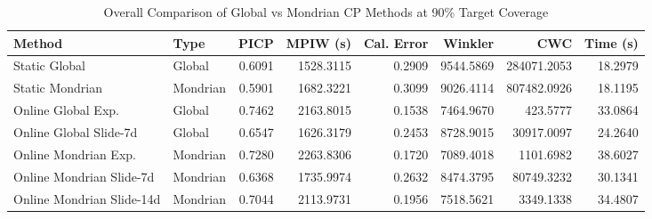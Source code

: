 \begin{table}
\caption{Overall Comparison of Global vs Mondrian CP Methods at 90\% Target Coverage}
\label{tab:t5c_1_overall}
\begin{tabular}{llrrrrrr}
\toprule
Method & Type & PICP & MPIW (s) & Cal. Error & Winkler & CWC & Time (s) \\
\midrule
Static Global & Global & 0.6091 & 1528.3115 & 0.2909 & 9544.5869 & 284071.2053 & 18.2979 \\
Static Mondrian & Mondrian & 0.5901 & 1682.3221 & 0.3099 & 9026.4114 & 807482.0926 & 18.1195 \\
Online Global Exp. & Global & 0.7462 & 2163.8015 & 0.1538 & 7464.9670 & 423.5777 & 33.0864 \\
Online Global Slide-7d & Global & 0.6547 & 1626.3179 & 0.2453 & 8728.9015 & 30917.0097 & 24.2640 \\
Online Mondrian Exp. & Mondrian & 0.7280 & 2263.8306 & 0.1720 & 7089.4018 & 1101.6982 & 38.6027 \\
Online Mondrian Slide-7d & Mondrian & 0.6368 & 1735.9974 & 0.2632 & 8474.3795 & 80749.3232 & 30.1341 \\
Online Mondrian Slide-14d & Mondrian & 0.7044 & 2113.9731 & 0.1956 & 7518.5621 & 3349.1338 & 34.4807 \\
\bottomrule
\end{tabular}
\end{table}
